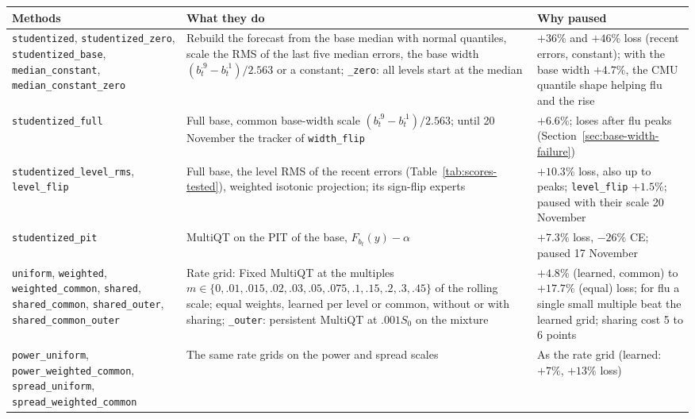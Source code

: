 \documentclass[11pt,a4paper]{article}
\theoremstyle{definition}
\theoremstyle{remark}
\begin{document}
\begin{center}\small
\renewcommand{\arraystretch}{1.15}
\begin{tabularx}{\textwidth}{@{}>{\raggedright\arraybackslash}p{}
 >{\raggedright\arraybackslash}X >{\raggedright\arraybackslash}p{}@{}}
\toprule
Methods & What they do & Why paused\\
\midrule
\texttt{studentized}, \texttt{studentized\_zero}, \texttt{studentized\_base},
\texttt{median\_constant}, \texttt{median\_constant\_zero}
 & Rebuild the forecast from the base median with normal quantiles, scale
   the RMS of the last five median errors, the base
   width $(b_t^{.9}-b_t^{.1})/2.563$ or a constant; \texttt{\_zero}:
   all levels start at the median
 & $+36\%$ and $+46\%$ loss (recent errors, constant); with the base width
   $+4.7\%$, the CMU quantile shape helping flu and the rise\\
\texttt{studentized\_full}
 & Full base, common base-width scale $(b_t^{.9}-b_t^{.1})/2.563$; until
   20 November the tracker of \texttt{width\_flip}
 & $+6.6\%$; loses after flu peaks (Section~\ref{sec:base-width-failure})\\
\texttt{studentized\_level\_rms}, \texttt{level\_flip}
 & Full base, the level RMS of the recent errors
   (Table~\ref{tab:scores-tested}), weighted isotonic projection; its
   sign-flip experts
 & $+10.3\%$ loss, also up to peaks; \texttt{level\_flip} $+1.5\%$;
   paused with their scale 20 November\\
\texttt{studentized\_pit}
 & MultiQT on the PIT of the base, $F_{b_t}(y)-\alpha$
 & $+7.3\%$ loss, $-26\%$ CE; paused 17 November\\
\texttt{uniform}, \texttt{weighted}, \texttt{weighted\_common}, \texttt{shared},
\texttt{shared\_common}, \texttt{shared\_outer}, \texttt{shared\_common\_outer}
 & Rate grid: Fixed MultiQT at the multiples
   $m\in\{0,.01,.015,.02,.03,\allowbreak.05,.075,.1,\allowbreak.15,.2,.3,.45\}$ of the rolling
   scale; equal weights, learned per level or common, without or with
   sharing; \texttt{\_outer}: persistent MultiQT at $.001S_0$ on the mixture
 & $+4.8\%$ (learned, common) to $+17.7\%$ (equal) loss; for flu a single
   small multiple beat the learned grid; sharing cost 5 to 6 points\\
\texttt{power\_uniform}, \texttt{power\_weighted\_common},
\texttt{spread\_uniform}, \texttt{spread\_weighted\_common}
 & The same rate grids on the power and spread scales
 & As the rate grid (learned: $+7\%$, $+13\%$ loss)\\

\end{tabularx}
\end{center}
\end{document}
